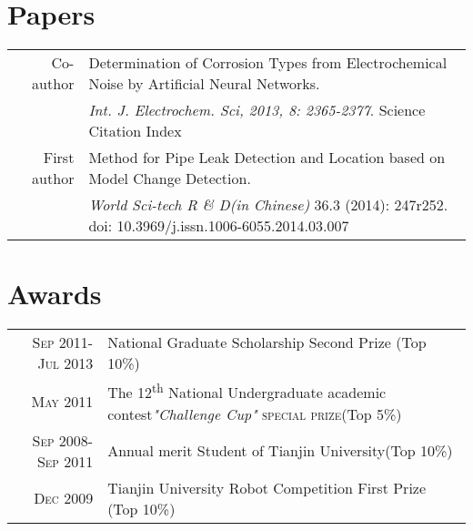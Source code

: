 \documentclass[a4paper,11pt]{article} %
\begin{document}
\section{Papers}
\begin{tabular}{rl}
Co-author & Determination of Corrosion Types from Electrochemical Noise by Artificial Neural Networks. \\

&\emph{Int. J. Electrochem. Sci, 2013, 8: 2365-2377}.   {\hfill \small{Science Citation Index}}\\
First author &  Method for Pipe Leak Detection and Location based on Model Change Detection. \\
&\emph{World Sci-tech R \& D(in Chinese)} 36.3 (2014): 247r252. {\hfill \small{doi: 10.3969/j.issn.1006-6055.2014.03.007}}\\
\end{tabular}




\section{Awards}

\begin{tabular}{rl}
\textsc{Sep 2011- Jul 2013} & National Graduate Scholarship Second Prize \small(Top 10\%)\normalsize\\
\textsc{May 2011} & The 12\textsuperscript{th} National Undergraduate academic contest\emph{"Challenge Cup"} \textsc{special prize}\small(Top 5\%)\\ %
\textsc{Sep 2008-Sep 2011} & Annual merit Student of Tianjin University\small(Top 10\%) \\
\textsc{Dec 2009} & Tianjin University Robot Competition First Prize \small(Top 10\%)\normalsize\\
\end{tabular}
\end{document}
